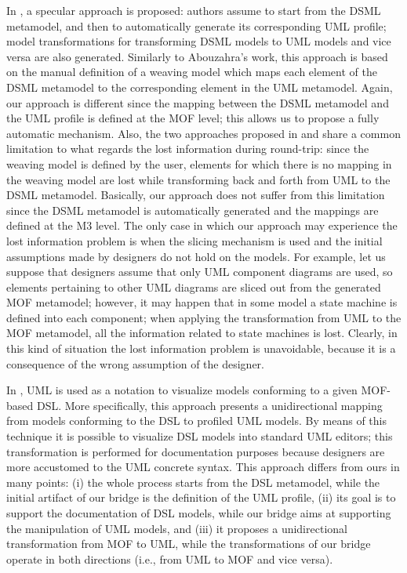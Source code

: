 In \cite{Wimmer}, a specular approach is proposed: authors assume to start from the DSML metamodel, and then to automatically
generate its corresponding UML profile; model transformations for transforming DSML models
to UML models and vice versa are also generated. Similarly to Abouzahra's work, this approach is based on the manual definition of a weaving model which maps
each element of the DSML metamodel to the corresponding element in the UML metamodel.
Again, our approach is different since the mapping between the DSML metamodel and the UML profile is defined at the MOF level; this
allows us to propose a fully automatic mechanism. Also, the two approaches proposed in \cite{Abouzahra} and \cite{Wimmer} share a common
limitation to what regards the lost information during round-trip: since the weaving model is defined by the user, 
elements for which there is no mapping in the weaving model are lost while transforming back and forth from UML to the DSML metamodel. 
Basically, our approach does not suffer from this limitation since the DSML metamodel is automatically generated and the mappings are defined at the M3 level. The only case in which our approach may experience the lost information problem is when the slicing mechanism is used and the initial assumptions made by designers do not hold on the models. For example, let us suppose that designers assume that only UML component diagrams
are used, so elements pertaining to other UML diagrams are sliced out from the generated MOF metamodel; however, it may happen that in some model a state machine is defined into each component; when applying the transformation from UML to the MOF metamodel, all the information
related to state machines is lost. Clearly, in this kind of situation the lost information problem is unavoidable, because it is a consequence of the wrong assumption of the designer.

In \cite{Graaf}, UML is used as a notation to visualize models conforming to a given MOF-based DSL.
More specifically, this approach presents a unidirectional mapping from models conforming to the DSL to profiled UML models.
By means of this technique it is possible to visualize DSL models into standard UML editors;
this transformation is performed for documentation purposes because designers are more accustomed to the UML concrete syntax.
This approach differs from ours in many points: 
(i) the whole process starts from the DSL metamodel, while the initial artifact of our bridge is the definition of the UML profile,
(ii) its goal is to support the documentation of DSL models, while our bridge aims at supporting the manipulation of UML models, and
(iii) it proposes a unidirectional transformation from MOF to UML, while the transformations of our bridge operate in both directions
(i.e., from UML to MOF and vice versa).

